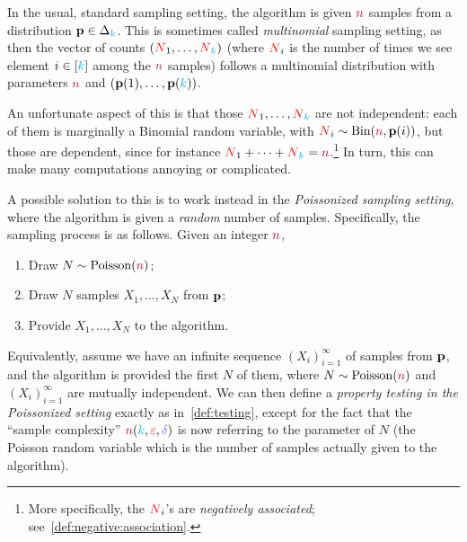 \newcommand{\fish}{\hspace{1pt}{\cdot}\kern -4pt {\subset}\kern -3pt {\rtimes}}

In the usual, standard sampling setting, the algorithm is given ${\textcolor{purple}{n}}$ \iid samples from a distribution $\mathbf{p}\in\Delta_{{\textcolor{cyan}{k}}}$. This is sometimes called \emph{multinomial} sampling setting, as then the vector of counts $(\textcolor{red}{N}_1,\dots,\textcolor{red}{N}_{\textcolor{cyan}{k}})$ (where $\textcolor{red}{N}_i$ is the number of times we see element $i\in[{\textcolor{cyan}{k}}]$ among the ${\textcolor{purple}{n}}$ samples) follows a multinomial distribution with parameters ${\textcolor{purple}{n}}$ and $(\mathbf{p}(1),\dots,\mathbf{p}({\textcolor{cyan}{k}}))$.

An unfortunate aspect of this is that those $\textcolor{red}{N}_1,\dots,\textcolor{red}{N}_{\textcolor{cyan}{k}}$ are not independent: each of them is marginally a Binomial random variable, with $\occur_i \sim \binomial{\ns}{\p(i)}$, but those are dependent, since for instance $\textcolor{red}{N}_1+\dots+\textcolor{red}{N}_{\textcolor{cyan}{k}}={\textcolor{purple}{n}}$.\footnote{More specifically, the $\textcolor{red}{N}_i$'s are \emph{negatively associated}; see~\cref{def:negative:association}.} In turn, this can make many computations annoying or complicated.

A possible solution to this is to work instead in the \emph{Poissonized sampling setting}, where the algorithm is given a \emph{random} number of samples. Specifically, the sampling process is as follows. Given an integer ${\textcolor{purple}{n}}$,
\begin{enumerate}
	\item Draw $N\sim\poisson{\ns}$;
	\item Draw $N$ \iid samples $X_1,\dots, X_N$ from $\mathbf{p}$;
	\item Provide $X_1,\dots, X_N$ to the algorithm.
\end{enumerate}
Equivalently, assume we have an infinite sequence $(X_i)_{i=1}^\infty$ of \iid samples from $\mathbf{p}$, and the algorithm is provided the first $N$ of them, where $N\sim\poisson{\ns}$ and $(X_i)_{i=1}^\infty$ are mutually independent. We can then define a \emph{property testing in the Poissonized setting} exactly as in~\cref{def:testing}, except for the fact that the ``sample complexity'' $\ns(\ab,\dst,\errprob)$ is now referring to the parameter of $N$ (the Poisson random variable which is the number of samples actually given to the algorithm).

